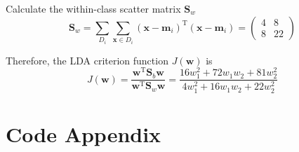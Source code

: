 \documentclass{article}
\begin{document}
Calculate the within-class scatter matrix $\mathbf{S}_{w}$
\begin{equation*}
    \mathbf{S}_{w} = \sum_{D_{i}} \sum_{\boldsymbol{x} \in D_{i}} 
    (\boldsymbol{x} - \boldsymbol{m}_{i})^{\mathrm{T}} (\boldsymbol{x} - \boldsymbol{m}_{i}) =
    \begin{pmatrix}
        4   &   8 \\
        8   &   22
    \end{pmatrix}
\end{equation*}

Therefore, the LDA criterion function $J(\boldsymbol{w})$ is
\begin{equation*}
    J(\boldsymbol{w}) = \frac{\boldsymbol{w}^{\mathrm{T}} \mathbf{S}_{b} \boldsymbol{w}}
    {\boldsymbol{w}^{\mathrm{T}} \mathbf{S}_{w} \boldsymbol{w}} =
    \frac{16 w_{1}^{2} + 72 w_{1} w_{2} + 81 w_{2}^{2}}
    {4 w_{1}^{2} + 16 w_{1} w_{2} + 22 w_{2}^{2}}
\end{equation*}

\newpage

\section*{Code Appendix}
\end{document}
